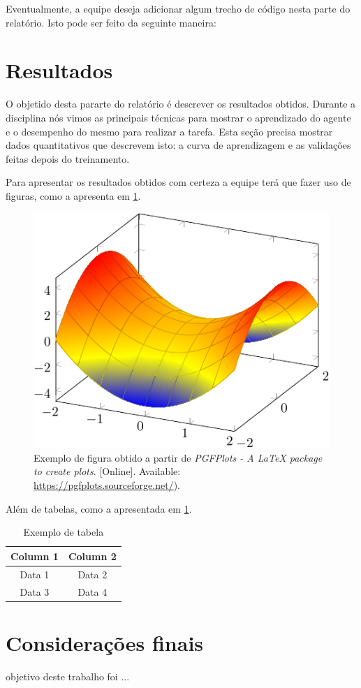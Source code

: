 \documentclass[9pt,a4paper,twoside]{tau}
\begin{document}
Eventualmente, a equipe deseja adicionar algum trecho de código nesta parte do relatório. Isto pode ser feito da seguinte maneira:



\section{Resultados}

O objetido desta pararte do relatório é descrever os resultados obtidos. Durante a disciplina nós vimos as principais técnicas para mostrar o aprendizado do agente e o desempenho do mesmo para realizar a tarefa. Esta seção precisa mostrar dados quantitativos que descrevem isto: a curva de aprendizagem e as validações feitas depois do treinamento.

Para apresentar os resultados obtidos com certeza a equipe terá que fazer uso de figuras, como a apresenta em \ref{fig:figure}.

\begin{figure}[htbp]
    \centering
    \includegraphics[width=0.8\columnwidth]{assets/example.pdf}
    \caption{Exemplo de figura obtido a partir de \textit{PGFPlots - A LaTeX package to create plots}. [Online]. Available: \url{https://pgfplots.sourceforge.net/}).}
    \label{fig:figure}
\end{figure}

Além de tabelas, como a apresentada em \ref{tab:table}.

\begin{table}[htbp]
    \caption{Exemplo de tabela}
    \label{tab:table}
    \centering
    \begin{tabular}{cc}
        \toprule
        \textbf{Column 1} & \textbf{Column 2} \\
        \midrule
        Data 1            & Data 2            \\
        Data 3            & Data 4            \\
        \bottomrule
    \end{tabular}
\end{table}

\section{Considerações finais}

 objetivo deste trabalho foi ...

\printbibliography
\end{document}
